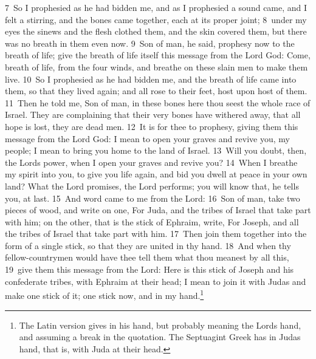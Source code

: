 \documentclass[10pt]{book} %
\begin{document}
\textcolor{benred8}{7}~So I prophesied as he had bidden me, and as I prophesied a sound came, and I felt a stirring, and the bones came together, each at its proper joint; \textcolor{benred8}{8}~under my eyes the sinews and the flesh clothed them, and the skin covered them, but there was no breath in them even now. \textcolor{benred8}{9}~Son of man, he said, prophesy now to the breath of life; give the breath of life itself this message from the Lord God: Come, breath of life, from the four winds, and breathe on these slain men to make them live. \textcolor{benred8}{10}~So I prophesied as he had bidden me, and the breath of life came into them, so that they lived again; and all rose to their feet, host upon host of them. \textcolor{benred8}{11}~Then he told me, Son of man, in these bones here thou seest the whole race of Israel. They are complaining that their very bones have withered away, that all hope is lost, they are dead men. \textcolor{benred8}{12}~It is for thee to prophesy, giving them this message from the Lord God: I mean to open your graves and revive you, my people; I mean to bring you home to the land of Israel. \textcolor{benred8}{13}~Will you doubt, then, the Lord\textquotesingle s power, when I open your graves and revive you? \textcolor{benred8}{14}~When I breathe my spirit into you, to give you life again, and bid you dwell at peace in your own land? What the Lord promises, the Lord performs; you will know that, he tells you, at last.
\textcolor{benred8}{15}~And word came to me from the Lord: \textcolor{benred8}{16}~Son of man, take two pieces of wood, and write on one, For Juda, and the tribes of Israel that take part with him; on the other, that is the stick of Ephraim, write, For Joseph, and all the tribes of Israel that take part with him. \textcolor{benred8}{17}~Then join them together into the form of a single stick, so that they are united in thy hand. \textcolor{benred8}{18}~And when thy fellow-countrymen would have thee tell them what thou meanest by all this, \textcolor{benred8}{19}~give them this message from the Lord: Here is this stick of Joseph and his confederate tribes, with Ephraim at their head; I mean to join it with Juda\textquotesingle s and make one stick of it; one stick now, and in my hand.\footnote[2]{The Latin version gives \textasciigrave in his hand\textquotesingle , but probably meaning \textasciigrave the Lord\textquotesingle s hand\textquotesingle , and assuming a break in the quotation. The Septuagint Greek has \textasciigrave in Juda\textquotesingle s hand\textquotesingle , that is, \textasciigrave with Juda at their head\textquotesingle .}
\end{document}
